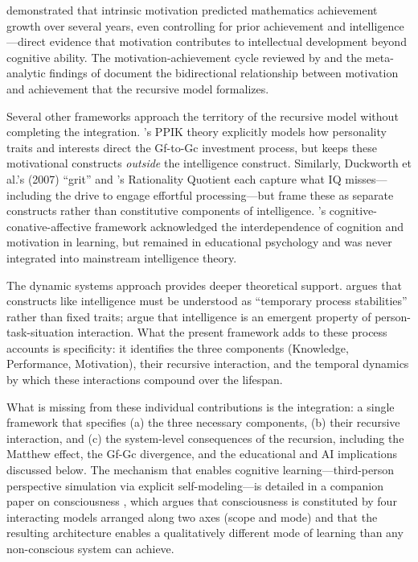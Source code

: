 \documentclass[12pt,a4paper]{article}
\begin{document}
\citet{Murayama2013} demonstrated that intrinsic motivation predicted mathematics achievement growth over several years, even controlling for prior achievement and intelligence---\hspace{0pt}direct evidence that motivation contributes to intellectual development beyond cognitive ability. The motivation-achievement cycle reviewed by \citet{Schiefele2017} and the meta-analytic findings of \citet{Huang2024} document the bidirectional relationship between motivation and achievement that the recursive model formalizes.

Several other frameworks approach the territory of the recursive model without completing the integration. \citeauthor{Ackerman1996}'s \citeyearpar{Ackerman1996} PPIK theory explicitly models how personality traits and interests direct the Gf-to-Gc investment process, but keeps these motivational constructs \emph{outside} the intelligence construct. Similarly, Duckworth et al.'s (2007) ``grit'' and \citeauthor{Stanovich2016}'s \citeyearpar{Stanovich2016} Rationality Quotient each capture what IQ misses---\hspace{0pt}including the drive to engage effortful processing---\hspace{0pt}but frame these as separate constructs rather than constitutive components of intelligence. \citeauthor{Snow1996}'s \citeyearpar{Snow1996} cognitive-conative-affective framework acknowledged the interdependence of cognition and motivation in learning, but remained in educational psychology and was never integrated into mainstream intelligence theory.

The dynamic systems approach provides deeper theoretical support. \citet{VanGeert2020} argues that constructs like intelligence must be understood as ``temporary process stabilities'' rather than fixed traits; \citet{Balboni2021} argue that intelligence is an emergent property of person-task-situation interaction. What the present framework adds to these process accounts is specificity: it identifies the three components (Knowledge, Performance, Motivation), their recursive interaction, and the temporal dynamics by which these interactions compound over the lifespan.

What is missing from these individual contributions is the integration: a single framework that specifies (a) the three necessary components, (b) their recursive interaction, and (c) the system-level consequences of the recursion, including the Matthew effect, the Gf-Gc divergence, and the educational and AI implications discussed below. The mechanism that enables cognitive learning---\hspace{0pt}third-person perspective simulation via explicit self-modeling---\hspace{0pt}is detailed in a companion paper on consciousness \citep{Gruber2026}, which argues that consciousness is constituted by four interacting models arranged along two axes (scope and mode) and that the resulting architecture enables a qualitatively different mode of learning than any non-conscious system can achieve.
\end{document}
